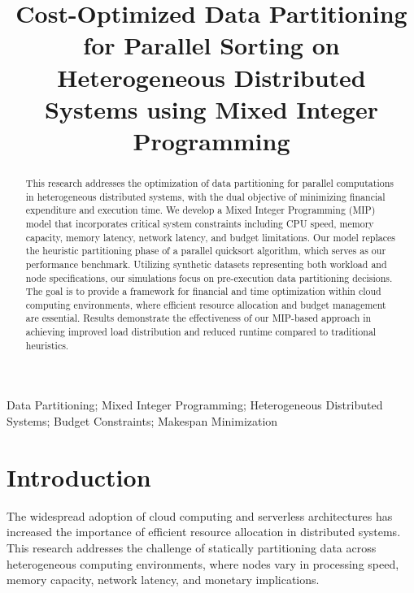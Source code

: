 \documentclass[]{interact}
\theoremstyle{plain}
\theoremstyle{definition}
\theoremstyle{remark}
\begin{document}

\title{Cost-Optimized Data Partitioning for Parallel Sorting on Heterogeneous Distributed Systems using Mixed Integer Programming}

\author{
}

\maketitle

\begin{abstract}
This research addresses the optimization of data partitioning for parallel computations in heterogeneous distributed systems, with the dual objective of minimizing financial expenditure and execution time. We develop a Mixed Integer Programming (MIP) model that incorporates critical system constraints including CPU speed, memory capacity, memory latency, network latency, and budget limitations. Our model replaces the heuristic partitioning phase of a parallel quicksort algorithm, which serves as our performance benchmark. Utilizing synthetic datasets representing both workload and node specifications, our simulations focus on pre-execution data partitioning decisions. The goal is to provide a framework for financial and time optimization within cloud computing environments, where efficient resource allocation and budget management are essential. Results demonstrate the effectiveness of our MIP-based approach in achieving improved load distribution and reduced runtime compared to traditional heuristics.
\end{abstract}

\begin{keywords}
Data Partitioning; Mixed Integer Programming; Heterogeneous Distributed Systems; Budget Constraints; Makespan Minimization
\end{keywords}

\section{Introduction}

The widespread adoption of cloud computing and serverless architectures has increased the importance of efficient resource allocation in distributed systems. This research addresses the challenge of statically partitioning data across heterogeneous computing environments, where nodes vary in processing speed, memory capacity, network latency, and monetary implications.
\end{document}

